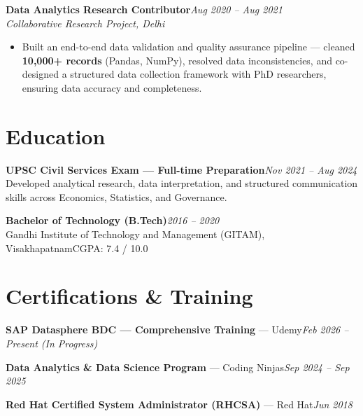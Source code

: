 \documentclass[10pt, letterpaper]{article}
\newcommand{\role}[3]{%
  \vspace{2pt}%
  {\bfseries #1}\hfill{\small\color{muted}\textit{#3}}\\[-2pt]%
  {\small\color{muted}\textit{#2}}%
}
\begin{document}
\vspace{1pt}

\role{Data Analytics Research Contributor}{Collaborative Research Project, Delhi}{Aug 2020 – Aug 2021}

\begin{itemize}
  \item Built an end-to-end data validation and quality assurance pipeline — cleaned \textbf{10,000+ records} (Pandas, NumPy), resolved data inconsistencies, and co-designed a structured data collection framework with PhD researchers, ensuring data accuracy and completeness.
\end{itemize}

\section{Education}

{\bfseries UPSC Civil Services Exam — Full-time Preparation}\hfill{\small\color{muted}\textit{Nov 2021 – Aug 2024}}\\
{\small\color{muted}Developed analytical research, data interpretation, and structured communication skills across Economics, Statistics, and Governance.}

\vspace{2pt}
{\bfseries Bachelor of Technology (B.Tech)}\hfill{\small\color{muted}\textit{2016 – 2020}}\\
{\small\color{muted}Gandhi Institute of Technology and Management (GITAM), Visakhapatnam\hfill CGPA: 7.4 / 10.0}

\section{Certifications \& Training}

{\bfseries SAP Datasphere BDC — Comprehensive Training} — Udemy\hfill{\small\color{muted}\textit{Feb 2026 – Present \emph{(In Progress)}}}

\vspace{1pt}
{\bfseries Data Analytics \& Data Science Program} — Coding Ninjas\hfill{\small\color{muted}\textit{Sep 2024 – Sep 2025}}

\vspace{1pt}
{\bfseries Red Hat Certified System Administrator (RHCSA)} — Red Hat\hfill{\small\color{muted}\textit{Jun 2018}}

\end{document}
